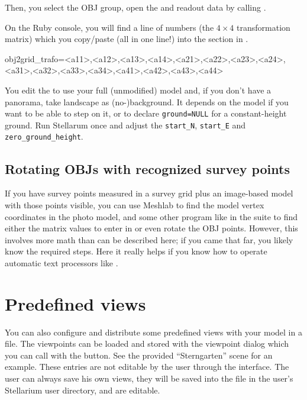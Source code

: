 Then, you select the OBJ group, open the  and readout data by calling
.

On the Ruby console, you will find a line of numbers (the $4\times4$
transformation matrix) which you copy/paste (all in one line!) into the
\file{[model]} section in .
\begin{configfile}
obj2grid_trafo=<a11>,<a12>,<a13>,<a14>,<a21>,<a22>,<a23>,<a24>,
               <a31>,<a32>,<a33>,<a34>,<a41>,<a42>,<a43>,<a44>
\end{configfile}
You edit the  to use your full (unmodified)
 model and, if you don't have a panorama, take 
landscape as (no-)background. It depends on the model if you want to
be able to step on it, or to declare \texttt{ground=NULL} for a
constant-height ground. Run Stellarum once and adjust the
\texttt{start\_N}, \texttt{start\_E} and \texttt{zero\_ground\_height}.

\subsection{Rotating OBJs with recognized survey points}
\label{sec:scenery3d:RotatingOBJ}

If you have survey points measured in a survey grid plus an image-based model
with those points visible, you can use Meshlab to find the model
vertex coordinates in the photo model, and some other program like
 in the  suite to find either the matrix
values to enter in  or even rotate the OBJ
points. However, this involves more math than can be described here;
if you came that far, you likely know the required steps.  Here it
really helps if you know how to operate automatic text processors like
.

\section{Predefined views}
You can also configure and distribute some predefined views with your
model in a  file. The viewpoints can be loaded
and stored with the viewpoint dialog which you can call with the
 button. See the provided
``Sterngarten'' scene for an example. These entries are not editable
by the user through the interface. The user can always save his own
views, they will be saved into the file  in the
user's Stellarium user directory, and are editable.

